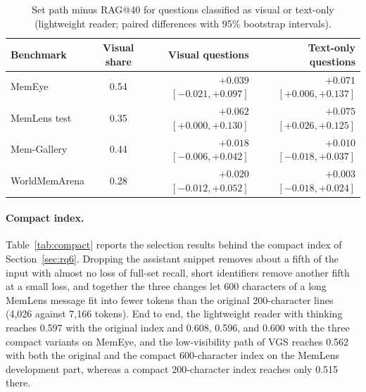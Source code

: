 \begin{table}[h]
\centering
\caption{Set path minus RAG@40 for questions classified as visual or text-only (lightweight reader; paired differences with 95\% bootstrap intervals).}
\label{tab:visualq}
\small
\begin{tabular}{lcrr}
\toprule
Benchmark & Visual share & Visual questions & Text-only questions \\
\midrule
MemEye & 0.54 & $+0.039$ $[-0.021, +0.097]$ & $+0.071$ $[+0.006, +0.137]$ \\
MemLens test & 0.35 & $+0.062$ $[+0.000, +0.130]$ & $+0.075$ $[+0.026, +0.125]$ \\
Mem-Gallery & 0.44 & $+0.018$ $[-0.006, +0.042]$ & $+0.010$ $[-0.018, +0.037]$ \\
WorldMemArena & 0.28 & $+0.020$ $[-0.012, +0.052]$ & $+0.003$ $[-0.018, +0.024]$ \\
\bottomrule
\end{tabular}
\end{table}

\paragraph{Compact index.} Table~\ref{tab:compact} reports the selection results behind the compact index of Section~\ref{sec:rq6}. Dropping the assistant snippet removes about a fifth of the input with almost no loss of full-set recall, short identifiers remove another fifth at a small loss, and together the three changes let 600 characters of a long MemLens message fit into fewer tokens than the original 200-character lines (4,026 against 7,166 tokens). End to end, the lightweight reader with thinking reaches 0.597 with the original index and 0.608, 0.596, and 0.600 with the three compact variants on MemEye, and the low-visibility path of VGS reaches 0.562 with both the original and the compact 600-character index on the MemLens development part, whereas a compact 200-character index reaches only 0.515 there.

